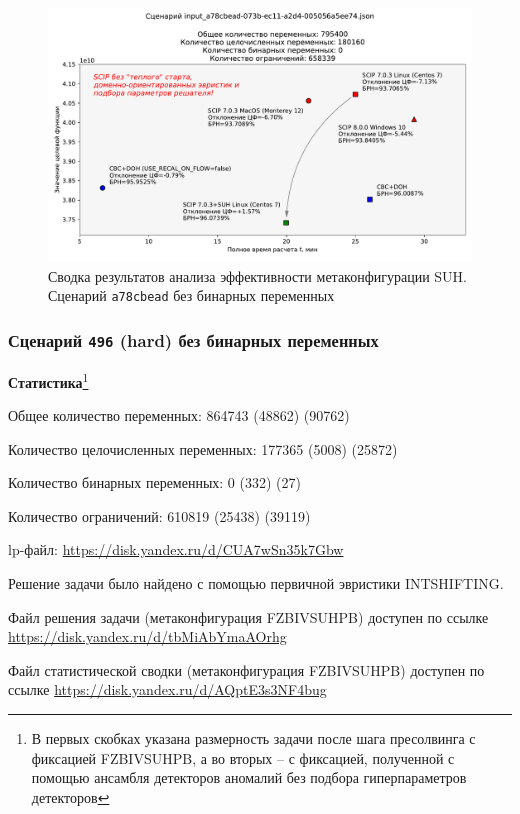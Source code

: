 \documentclass[%
	11pt,
	a4paper,
	utf8,
		]{article}
\begin{document}
\begin{figure}[!h]
	\centering
	\includegraphics[scale=0.6]{figures/summary_a78cbead.pdf}
	\caption{Сводка результатов анализа эффективности метаконфигурации SUH. \\Сценарий \texttt{a78cbead} без бинарных переменных}\label{fig:summary_a78cbead}
\end{figure}

\subsubsection{Сценарий \texttt{496} (hard) без бинарных переменных}

\textbf{Статистика}\footnote{В первых скобках указана размерность задачи после шага пресолвинга с фиксацией FZBIVSUHPB, а во вторых -- с фиксацией, полученной с помощью ансамбля детекторов аномалий без подбора гиперпараметров детекторов}\vspace*{1mm}

Общее количество переменных: 864743 (48862) (90762)

Количество целочисленных переменных: 177365 (5008) (25872)

Количество бинарных переменных: 0 (332) (27)

Количество ограничений: 610819 (25438) (39119)

lp-файл: \url{https://disk.yandex.ru/d/CUA7wSn35k7Gbw}

Решение задачи было найдено с помощью первичной эвристики {INTSHIFTING}.

Файл решения задачи (метаконфигурация FZBIVSUHPB) доступен по ссылке \url{https://disk.yandex.ru/d/tbMiAbYmaAOrhg}

Файл статистической сводки (метаконфигурация FZBIVSUHPB) доступен по ссылке \url{https://disk.yandex.ru/d/AQptE3s3NF4bug}
\end{document}
